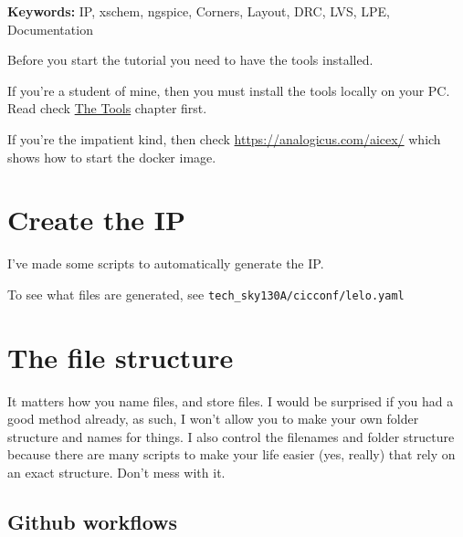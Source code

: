 \textbf{Keywords:} IP, xschem, ngspice, Corners, Layout, DRC, LVS, LPE,
Documentation

Before you start the tutorial you need to have the tools installed.

If you're a student of mine, then you must install the tools locally on
your PC. Read check \href{https://analogicus.com/aic2026/the_tools}{The
Tools} chapter first.

If you're the impatient kind, then check
\url{https://analogicus.com/aicex/} which shows how to start the docker
image.

\section{Create the IP}\label{create-the-ip}

I've made some scripts to automatically generate the IP.

To see what files are generated, see
\texttt{tech\_sky130A/cicconf/lelo.yaml}

\begin{Shaded}
\begin{Highlighting}[]
\end{Highlighting}
\end{Shaded}

\section{The file structure}\label{the-file-structure}

It matters how you name files, and store files. I would be surprised if
you had a good method already, as such, I won't allow you to make your
own folder structure and names for things. I also control the filenames
and folder structure because there are many scripts to make your life
easier (yes, really) that rely on an exact structure. Don't mess with
it.

\subsection{Github workflows}\label{github-workflows}

